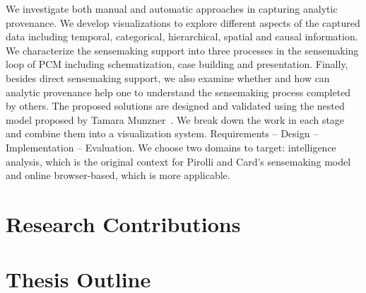 We investigate both manual and automatic approaches in capturing analytic provenance. We develop visualizations to explore different aspects of the captured data including temporal, categorical, hierarchical, spatial and causal information. We characterize the sensemaking support into three processes in the sensemaking loop of PCM including schematization, case building and presentation. Finally, besides direct sensemaking support, we also examine whether and how can analytic provenance help one to understand the sensemaking process completed by others. The proposed solutions are designed and validated using the nested model proposed by Tamara Munzner~\cite{Munzner2009}. We break down the work in each stage and combine them into a visualization system. Requirements -- Design -- Implementation -- Evaluation. We choose two domains to target: intelligence analysis, which is the original context for Pirolli and Card's sensemaking model and online browser-based, which is more applicable.



\section{Research Contributions}

\section{Thesis Outline} 

